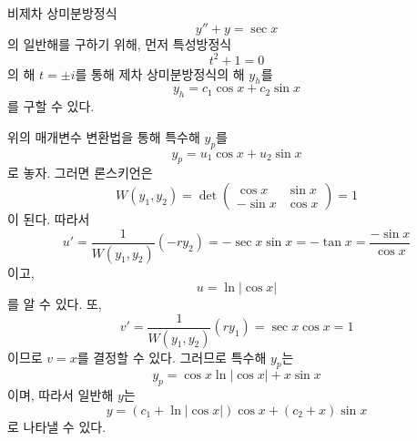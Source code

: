 \documentclass[../engineering_mathematics_lecture_note.tex]{subfiles}
\begin{document}
\begin{example}
    비제차 상미분방정식
    \begin{equation*}
        y'' + y = \sec x
    \end{equation*}
    의 일반해를 구하기 위해, 먼저 특성방정식
    \begin{equation*}
        t^2 + 1 = 0
    \end{equation*}
    의 해 $t = \pm i$를 통해 제차 상미분방정식의 해 $y_h$를
    \begin{equation*}
        y_h = c_1 \cos x + c_2 \sin x
    \end{equation*}
    를 구할 수 있다.

    위의 매개변수 변환법을 통해 특수해 $y_p$를
    \begin{equation*}
        y_p = u_1 \cos x + u_2 \sin x
    \end{equation*}
    로 놓자.
    그러면 론스키언은
    \begin{equation*}
        W(y_1, y_2) = \det \begin{pmatrix}
            \cos x & \sin x\\
            - \sin x & \cos x
        \end{pmatrix} = 1
    \end{equation*}
    이 된다.
    따라서
    \begin{equation*}
        u' = \frac{1}{W(y_1, y_2)} (-r y_2) = - \sec x \sin x = -\tan x = \frac{- \sin x}{\cos x} 
    \end{equation*}
    이고,
    \begin{equation*}
        u = \ln \left| \cos x \right|
    \end{equation*}
    를 알 수 있다.
    또,
    \begin{equation*}
        v' = \frac{1}{W(y_1, y_2)} (r y_1) = \sec x \cos x = 1
    \end{equation*}
    이므로 $v = x$를 결정할 수 있다.
    그러므로 특수해 $y_p$는
    \begin{equation*}
        y_p = \cos x \ln \left| \cos x \right| + x \sin x
    \end{equation*}
    이며, 따라서 일반해 $y$는
    \begin{equation*}
        y = (c_1 + \ln \left| \cos x \right|) \cos x + (c_2 + x) \sin x
    \end{equation*}
    로 나타낼 수 있다.
\end{example}
\end{document}
